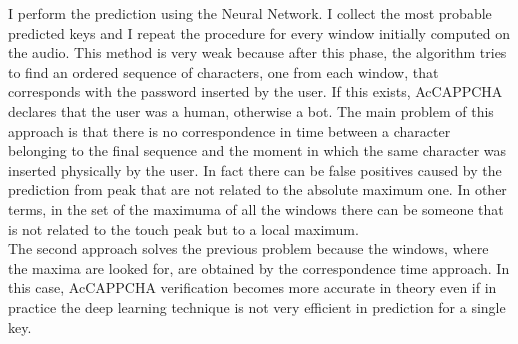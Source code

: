 I perform the prediction using the Neural Network. I collect the most probable predicted keys and I repeat the procedure for every window initially computed on the audio. This method is very weak because after this phase, the algorithm tries to find an ordered sequence of characters, one from each window, that corresponds with the password inserted by the user. If this exists, AcCAPPCHA declares that the user was a human, otherwise a bot. The main problem of this approach is that there is no correspondence in time between a character belonging to the final sequence and the moment in which the same character was inserted physically by the user. In fact there can be false positives caused by the prediction from peak that are not related to the absolute maximum one. In other terms, in the set of the maximuma of all the windows there can be someone that is not related to the touch peak but to a local maximum.\\
The second approach solves the previous problem because the windows, where the maxima are looked for, are obtained by the correspondence time approach. In this case, AcCAPPCHA verification becomes more accurate in theory even if in practice the deep learning technique is not very efficient in prediction for a single key.

